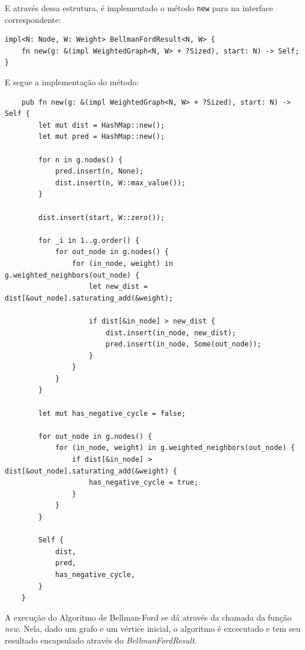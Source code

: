 E através dessa estrutura, é implementado o método \texttt{new} para
na interface correspondente:

\begin{listing}[H]
  \caption{Interface do algoritmo de Bellman-Ford}
\begin{verbatim}
impl<N: Node, W: Weight> BellmanFordResult<N, W> {
    fn new(g: &(impl WeightedGraph<N, W> + ?Sized), start: N) -> Self;
}
\end{verbatim}
\end{listing}

E segue a implementação do método:

\begin{listing}[H]
  \caption{Implementação do Algoritmo de Bellman-Ford}
\begin{verbatim}
    pub fn new(g: &(impl WeightedGraph<N, W> + ?Sized), start: N) -> Self {
        let mut dist = HashMap::new();
        let mut pred = HashMap::new();

        for n in g.nodes() {
            pred.insert(n, None);
            dist.insert(n, W::max_value());
        }

        dist.insert(start, W::zero());

        for _i in 1..g.order() {
            for out_node in g.nodes() {
                for (in_node, weight) in g.weighted_neighbors(out_node) {
                    let new_dist = dist[&out_node].saturating_add(&weight);

                    if dist[&in_node] > new_dist {
                        dist.insert(in_node, new_dist);
                        pred.insert(in_node, Some(out_node));
                    }
                }
            }
        }

        let mut has_negative_cycle = false;

        for out_node in g.nodes() {
            for (in_node, weight) in g.weighted_neighbors(out_node) {
                if dist[&in_node] > dist[&out_node].saturating_add(&weight) {
                    has_negative_cycle = true;
                }
            }
        }

        Self {
            dist,
            pred,
            has_negative_cycle,
        }
    }
\end{verbatim}
\end{listing}

A execução do Algoritmo de Bellman-Ford se dá através da chamada da
função \textit{new}. Nela, dado um grafo e um vértice inicial, o
algoritmo é excecutado e tem seu resultado encapsulado através do
\textit{BellmanFordResult}.
